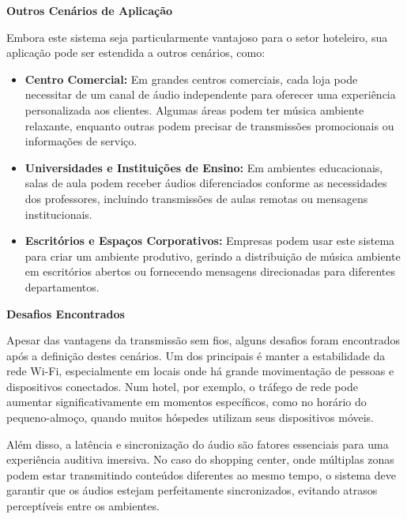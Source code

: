 \documentclass{article}
\begin{document}
\newpage 

\textbf{Outros Cenários de Aplicação}

Embora este sistema seja particularmente vantajoso para o setor hoteleiro, sua aplicação pode ser estendida a outros cenários, como:

\begin{itemize}
    \item \textbf{Centro Comercial: } Em grandes centros comerciais, cada loja pode necessitar de um canal de áudio independente para oferecer uma experiência personalizada aos clientes. Algumas áreas podem ter música ambiente relaxante, enquanto outras podem precisar de transmissões promocionais ou informações de serviço.

    \item  \textbf{Universidades e Instituições de Ensino:} Em ambientes educacionais, salas de aula podem receber áudios diferenciados conforme as necessidades dos professores, incluindo transmissões de aulas remotas ou mensagens institucionais.

    \item \textbf{Escritórios e Espaços Corporativos: } Empresas podem usar este sistema para criar um ambiente produtivo, gerindo a distribuição de música ambiente em escritórios abertos ou fornecendo mensagens direcionadas para diferentes departamentos.
    
\end{itemize}


\hspace{5cm}


\textbf{Desafios Encontrados}

Apesar das vantagens da transmissão sem fios, alguns desafios foram encontrados após a definição destes cenários. Um dos principais é manter a estabilidade da rede Wi-Fi, especialmente em locais onde há grande movimentação de pessoas e dispositivos conectados. Num hotel, por exemplo, o tráfego de rede pode aumentar significativamente em momentos específicos, como no horário do pequeno-almoço, quando muitos hóspedes utilizam seus dispositivos móveis.

Além disso, a latência e sincronização do áudio são fatores essenciais para uma experiência auditiva imersiva. No caso do shopping center, onde múltiplas zonas podem estar transmitindo conteúdos diferentes ao mesmo tempo, o sistema deve garantir que os áudios estejam perfeitamente sincronizados, evitando atrasos perceptíveis entre os ambientes.
\end{document}
